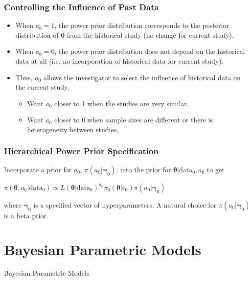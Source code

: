 \documentclass{beamer}
\begin{document}
\begin{frame}
\frametitle{Controlling the Influence of Past Data}
\begin{itemize}
\item When \color{orange}$a_0 = 1$\color{black}, the power prior distribution corresponds to the posterior distribution of $\pmb{\theta}$ from the historical study (no change for current study).
\item When \color{orange}$a_0 = 0$\color{black}, the power prior distribution does not depend on the historical data at all (i.e. no incorporation of historical data for current study). 
\item Thus, $a_0$ allows the investigator to select the influence of historical data on the current study. 
	\begin{itemize}
	\item Want $a_0$ closer to 1 when the studies are very similar. 
	\item Want $a_0$ closer to 0 when sample sizes are different or there is heterogeneity between studies. 
	\end{itemize} 
\end{itemize}
\end{frame}

\begin{frame}
\frametitle{Hierarchical Power Prior Specification}
Incorporate a prior for $a_0$, $\pi(a_0|\pmb{\gamma}_0)$, into the prior for $\pmb{\theta}|\text{data}_0, a_0$ to get
\begin{center}
$\pi(\pmb{\theta}, a_0|\text{data}_0) \propto L(\pmb{\theta}|\text{data}_0)^{a_0}\pi_0(\pmb{\theta}|c_{0})\pi(a_0|\pmb{\gamma}_0)$
\end{center}
where $\pmb{\gamma}_0$ is a specified vector of hyperparameters. A natural choice for $\pi(a_0|\pmb{\gamma}_0)$ is a \color{orange} beta prior\color{black}. 
\end{frame}

\section{Bayesian Parametric Models}

\begin{frame}[c]
\begin{center}
\huge
Bayesian Parametric Models
\end{center}
\end{frame}
\end{document}
